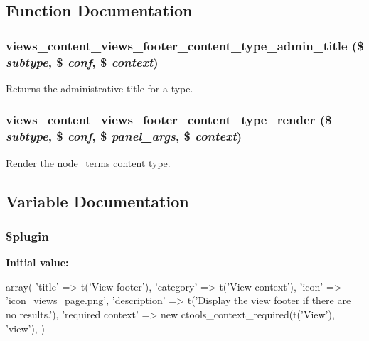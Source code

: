 \subsection{Function Documentation}
\hypertarget{views__footer_8inc_ac8cb9d36181f7d855506a347de3f5b7c}{
\subsubsection[{views\_\-content\_\-views\_\-footer\_\-content\_\-type\_\-admin\_\-title}]{\setlength{\rightskip}{0pt plus 5cm}views\_\-content\_\-views\_\-footer\_\-content\_\-type\_\-admin\_\-title (\$ {\em subtype}, \/  \$ {\em conf}, \/  \$ {\em context})}}
\label{views__footer_8inc_ac8cb9d36181f7d855506a347de3f5b7c}
Returns the administrative title for a type. \hypertarget{views__footer_8inc_a8e03dd3548aa636686b34c1ef017102e}{
\subsubsection[{views\_\-content\_\-views\_\-footer\_\-content\_\-type\_\-render}]{\setlength{\rightskip}{0pt plus 5cm}views\_\-content\_\-views\_\-footer\_\-content\_\-type\_\-render (\$ {\em subtype}, \/  \$ {\em conf}, \/  \$ {\em panel\_\-args}, \/  \$ {\em context})}}
\label{views__footer_8inc_a8e03dd3548aa636686b34c1ef017102e}
Render the node\_\-terms content type. 

\subsection{Variable Documentation}
\hypertarget{views__footer_8inc_ada8a7130088351710bb02ed622d6bf65}{
\subsubsection[{\$plugin}]{\setlength{\rightskip}{0pt plus 5cm}\$plugin}}
\label{views__footer_8inc_ada8a7130088351710bb02ed622d6bf65}
{\bfseries Initial value:}
\begin{DoxyCode}
 array(
  'title' => t('View footer'),
  'category' => t('View context'),
  'icon' => 'icon_views_page.png',
  'description' => t('Display the view footer if there are no results.'),
  'required context' => new ctools_context_required(t('View'), 'view'),
)
\end{DoxyCode}
